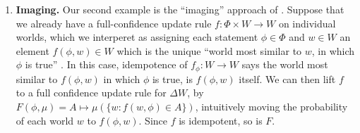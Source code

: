 \begin{subappendices}
\begin{enumerate}[wide, label=\textbf{\thesubsection.\arabic*}]
    	\item
    	\textbf{Imaging.}
    	Our second example is the ``imaging''
    	approach of \textcite{lewis1976probabilities}.
    	Suppose that
     	we already have a full-confidence update rule
    	$f : \Phi \times W \to W$ on individual worlds, which we interperet as assigning each statement $\phi \in \Phi$ and $w \in W$ an element $f(\phi, w) \in W$ which is the unique ``world most similar to $w$, in which $\phi$ is true'' \parencite{gardenfors1979imaging}.
    	In this case, idempotence of $f_\phi: W \to W$
    	says the world most similar to $f(\phi,w)$ in which $\phi$ is true, is $f(\phi,w)$ itself.
    	We can then 
    	lift $f$ to a full confidence update rule for $\Delta W$,
    	by
    	$%
        		F(\phi, \mu) 
        			= A \mapsto \mu(\{w : f(w, \phi) \in A\})
    	$,
    	intuitively moving the probability of each  world $w$ to
    	$f(\phi,w)$.	
    	Since $f$ is idempotent, so is $F$.



\end{enumerate}
\end{subappendices}
